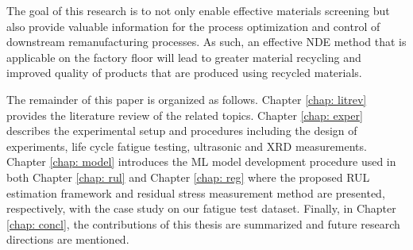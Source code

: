 The goal of this research is to not only enable effective materials screening but also provide valuable information for the process optimization and control of downstream remanufacturing processes. As such, an effective NDE method that is applicable on the factory floor will lead to greater material recycling and improved quality of products that are produced using recycled materials.

The remainder of this paper is organized as follows. Chapter \ref{chap: litrev} provides the literature review of the related topics. Chapter \ref{chap: exper} describes the experimental setup and procedures including the design of experiments, life cycle fatigue testing, ultrasonic and XRD measurements. Chapter \ref{chap: model} introduces the ML model development procedure used in both Chapter \ref{chap: rul} and Chapter \ref{chap: reg} where the proposed RUL estimation framework and residual stress measurement method are presented, respectively, with the case study on our fatigue test dataset. Finally, in Chapter \ref{chap: concl}, the contributions of this thesis are summarized and future research directions are mentioned.

